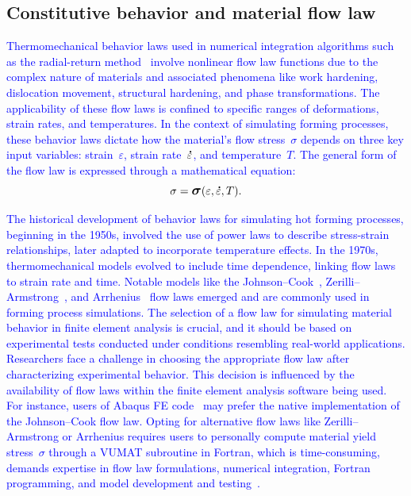 \documentclass[algorithms,article,submit,pdftex,oneauthors]{Definitions/mdpi}
\DeclareRobustCommand{\mdot}[1]{\accentset{\mbox{\bfseries .}}{#1}}
\DeclareRobustCommand{\Sig}{\mbox{\large\ensuremath{\boldsymbol{\sigma}}}}
\begin{document}
\subsection{Constitutive behavior and material flow law}\label{subsec:ConstBehavior}

\textcolor{blue}{Thermomechanical behavior laws used in numerical integration algorithms such as the radial-return method~\cite{Ponthot-2002-USU} involve nonlinear flow law functions due to the complex nature of materials and associated phenomena like work hardening, dislocation movement, structural hardening, and phase transformations.
The applicability of these flow laws is confined to specific ranges of deformations, strain rates, and temperatures.
In the context of simulating forming processes, these behavior laws dictate how the material's flow stress~$\sigma$ depends on three key input variables: strain~$\varepsilon$, strain rate~$\mdot{\varepsilon}$, and temperature~$T$.
The general form of the flow law is expressed through a mathematical equation:}
\begin{equation}
\sigma = \Sig\left(\varepsilon, \mdot{\varepsilon}, T\right).\label{eq:GenFlow}
\end{equation}

\textcolor{blue}{The historical development of behavior laws for simulating hot forming processes, beginning in the 1950s, involved the use of power laws to describe stress-strain relationships, later adapted to incorporate temperature effects.
In the 1970s, thermomechanical models evolved to include time dependence, linking flow laws to strain rate and time.
Notable models like the Johnson--Cook~\cite{Johnson-1983-CMD}, Zerilli--Armstrong~\cite{Zerilli-1987-DMB}, and Arrhenius~\cite{Jonas-1969} flow laws emerged and are commonly used in forming process simulations.
The selection of a flow law for simulating material behavior in finite element analysis is crucial, and it should be based on experimental tests conducted under conditions resembling real-world applications.
Researchers face a challenge in choosing the appropriate flow law after characterizing experimental behavior.
This decision is influenced by the availability of flow laws within the finite element analysis software being used.
For instance, users of Abaqus FE code~\cite{Abaqus} may prefer the native implementation of the Johnson--Cook flow law.
Opting for alternative flow laws like Zerilli--Armstrong or Arrhenius requires users to personally compute material yield stress~$\sigma$ through a VUMAT subroutine in Fortran, which is time-consuming, demands expertise in flow law formulations, numerical integration, Fortran programming, and model development and testing~\cite{Gao-2007-FRT, Ming-2018-ERV, Liang-2022}.}
\end{document}
